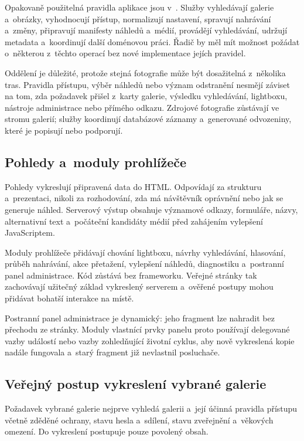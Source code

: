 \documentclass[11pt,a4paper]{article}
\newcommand{\filepath}[1]{\path{#1}}
\begin{document}
Opakovaně použitelná pravidla aplikace jsou v~\filepath{app/services/}. Služby
vyhledávají galerie a~obrázky, vyhodnocují přístup, normalizují nastavení,
spravují nahrávání a~změny, připravují manifesty náhledů a~médií, provádějí
vyhledávání, udržují metadata a~koordinují další doménovou práci. Řadič by měl
mít možnost požádat o~některou z~těchto operací bez nové implementace jejích
pravidel.

Oddělení je důležité, protože stejná fotografie může být dosažitelná z~několika
tras. Pravidla přístupu, výběr náhledů nebo význam odstranění nesmějí záviset na
tom, zda požadavek přišel z~karty galerie, výsledku vyhledávání, lightboxu,
nástroje administrace nebo přímého odkazu. Zdrojové fotografie zůstávají ve
stromu galerií; služby koordinují databázové záznamy a~generované odvozeniny,
které je popisují nebo podporují.

\subsection{Pohledy a~moduly prohlížeče}

Pohledy vykreslují připravená data do HTML. Odpovídají za strukturu
a~prezentaci, nikoli za rozhodování, zda má návštěvník oprávnění nebo jak se
generuje náhled. Serverový výstup obsahuje významové odkazy, formuláře, názvy,
alternativní text a~počáteční kandidáty médií před zahájením vylepšení
JavaScriptem.

Moduly prohlížeče přidávají chování lightboxu, návrhy vyhledávání, hlasování,
průběh nahrávání, akce přetažení, vylepšení náhledů, diagnostiku a~postranní
panel administrace. Kód zůstává bez frameworku. Veřejné stránky tak zachovávají
užitečný základ vykreslený serverem a~ověřené postupy mohou přidávat bohatší
interakce na místě.

Postranní panel administrace je dynamický: jeho fragment lze nahradit bez
přechodu ze stránky. Moduly vlastnící prvky panelu proto používají delegované
vazby událostí nebo vazby zohledňující životní cyklus, aby nově vykreslená kopie
nadále fungovala a~starý fragment již nevlastnil posluchače.

\subsection{Veřejný postup vykreslení vybrané galerie}

Požadavek vybrané galerie nejprve vyhledá galerii a~její účinná pravidla
přístupu včetně zděděné ochrany, stavu hesla a~sdílení, stavu zveřejnění
a~věkových omezení. Do vykreslení postupuje pouze povolený obsah.
\end{document}
